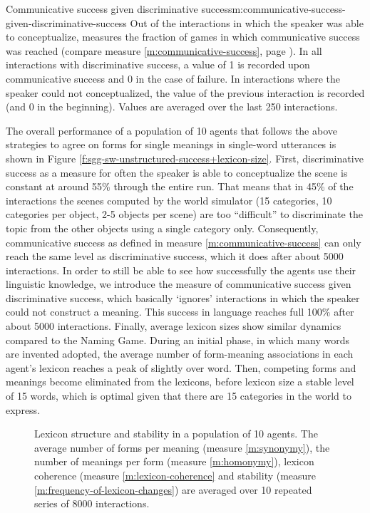 \begin{measure}[b]{Communicative success given discriminative
    success}{m:communicative-success-given-discriminative-success}
  Out of the interactions in which the speaker was able to
  conceptualize, measures the fraction of games in which communicative
  success was reached (compare measure \ref{m:communicative-success},
  page \pageref{m:communicative-success}). In all interactions with
  discriminative success, a value of 1 is recorded upon communicative
  success and 0 in the case of failure. In interactions where the
  speaker could not conceptualized, the value of the previous
  interaction is recorded (and 0 in the beginning). Values are
  averaged over the last 250 interactions.
\end{measure}

\noindent The overall performance of a population of 10 agents that
follows the above strategies to agree on forms for single meanings in
single-word utterances is shown in Figure
\ref{f:sgg-sw-unstructured-success+lexicon-size}. First,
discriminative success as a measure for often the speaker is able to
conceptualize the scene is constant at around 55\% through the entire
run. That means that in 45\% of the interactions the scenes computed
by the world simulator (15 categories, 10 categories per object, 2-5
objects per scene) are too ``difficult'' to discriminate the topic
from the other objects using a single category only. Consequently,
communicative success as defined in measure
\ref{m:communicative-success} can only reach the same level as
discriminative success, which it does after about 5000
interactions. In order to still be able to see how successfully the
agents use their linguistic knowledge, we introduce the measure of
communicative success given discriminative success, which basically
`ignores' interactions in which the speaker could not construct a
meaning. This success in language reaches full 100\% after about 5000
interactions. Finally, average lexicon sizes show similar dynamics
compared to the Naming Game. During an initial phase, in which many
words are invented adopted, the average number of form-meaning
associations in each agent's lexicon reaches a peak of slightly over
word. Then, competing forms and meanings become eliminated from the
lexicons, before lexicon size a stable level of 15 words, which is
optimal given that there are 15 categories in the world to express.





\begin{figure}[t]
  \caption{Lexicon structure and stability in a population of 10
    agents. The average number of forms per meaning (measure
    \ref{m:synonymy}), the number of meanings per form (measure
    \ref{m:homonymy}), lexicon coherence (measure
    \ref{m:lexicon-coherence} and stability (measure
    \ref{m:frequency-of-lexicon-changes}) are averaged over 10
    repeated series of 8000 interactions.}
  \label{f:sgg-sw-unstructured-lexicon}
\end{figure}


